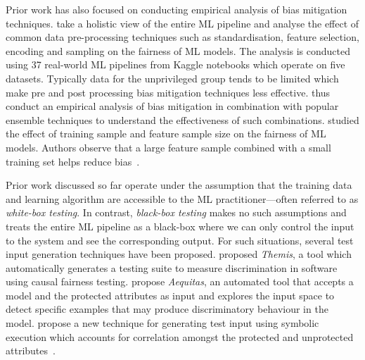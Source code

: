 \documentclass[sigconf,review,anonymous]{acmart}
\begin{document}
Prior work has also focused on conducting empirical analysis of bias
mitigation techniques. \citeauthor{biswas2021fair} take a holistic
view of the entire ML pipeline and analyse the effect of common data
pre-processing techniques such as standardisation, feature selection,
encoding and sampling on the fairness of ML models. The analysis is
conducted using 37 real-world ML pipelines from Kaggle notebooks which
operate on five datasets. Typically data for the unprivileged group
tends to be limited which make pre and post processing bias mitigation
techniques less effective. \citeauthor{feffer2022empirical} thus
conduct an empirical analysis of bias mitigation in combination with
popular ensemble techniques to understand the effectiveness of such
combinations. \citeauthor{zhang2021ignorance} studied the effect of
training sample and feature sample size on the fairness of ML
models. Authors observe that a large feature sample combined with
a small training set helps reduce
bias \cite{biswas2021fair,feffer2022empirical,zhang2021ignorance}.

Prior work discussed so far operate under the assumption that the
training data and learning algorithm are accessible to the ML
practitioner---often referred to as \emph{white-box testing}. In
contrast, \emph{black-box testing} makes no such assumptions and
treats the entire ML pipeline as a black-box where we can only control
the input to the system and see the corresponding output. For such
situations, several test input generation techniques have been
proposed. \citeauthor{galhotra2017fairness} proposed \emph{Themis},
a tool which automatically generates a testing suite to measure
discrimination in software using causal fairness
testing. \citeauthor{udeshi2018automated} propose \emph{Aequitas}, an
automated tool that accepts a model and the protected attributes as
input and explores the input space to detect specific examples that
may produce discriminatory behaviour in the
model. \citeauthor{aggarwal2019black} propose a new technique for
generating test input using symbolic execution which accounts for
correlation amongst the protected and unprotected
attributes \cite{aggarwal2019black,udeshi2018automated,galhotra2017fairness}.

\end{document}
